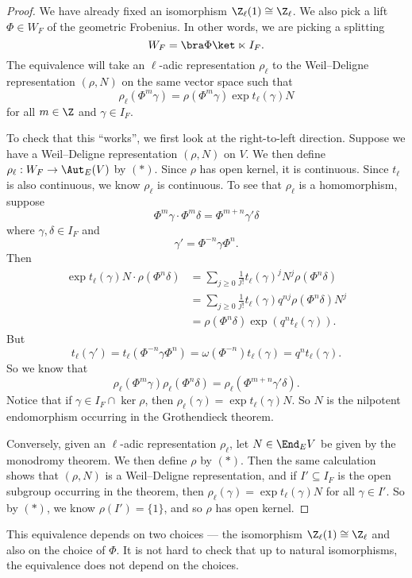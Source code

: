 \documentclass[a4paper]{article}
\begin{document}
\begin{proof}
  We have already fixed an isomorphism $\Z_\ell(1) \cong \Z_\ell$. We also pick a lift $\Phi \in W_F$ of the geometric Frobenius. In other words, we are picking a splitting
  \[
    W_F = \bra \Phi\ket \ltimes I_F.
  \]
  The equivalence will take an $\ell$-adic representation $\rho_\ell$ to the Weil--Deligne representation $(\rho, N)$ on the same vector space such that
  \[
    \rho_\ell(\Phi^m \gamma) = \rho (\Phi^m \gamma) \exp t_\ell(\gamma) N\tag{$*$}
  \]
  for all $m \in \Z$ and $\gamma \in I_F$.

  To check that this ``works'', we first look at the right-to-left direction. Suppose we have a Weil--Deligne representation $(\rho, N)$ on $V$. We then define $\rho_\ell: W_F \to \Aut_E(V)$ by $(*)$. Since $\rho$ has open kernel, it is continuous. Since $t_\ell$ is also continuous, we know $\rho_\ell$ is continuous. To see that $\rho_\ell$ is a homomorphism, suppose
  \[
    \Phi^m \gamma \cdot \Phi^m \delta = \Phi^{m + n} \gamma' \delta
  \]
  where $\gamma, \delta \in I_F$ and
  \[
    \gamma' = \Phi^{-n} \gamma \Phi^n.
  \]
  Then
  \begin{align*}
    \exp t_\ell(\gamma) N \cdot \rho(\Phi^n \delta) &= \sum_{j \geq 0} \frac{1}{j!} t_\ell(\gamma)^j N^j \rho(\Phi^n \delta)\\
    &= \sum_{j \geq 0} \frac{1}{j!} t_\ell(\gamma) q^{nj} \rho(\Phi^n \delta) N^j\\
    &= \rho (\Phi^n \delta) \exp (q^n t_\ell(\gamma)).
  \end{align*}
  But
  \[
    t_\ell(\gamma') = t_\ell(\Phi^{-n} \gamma \Phi^n) = \omega(\Phi^{-n}) t_\ell(\gamma) = q^n t_\ell(\gamma).
  \]
  So we know that
  \[
    \rho_\ell(\Phi^m \gamma) \rho_\ell(\Phi^n \delta) = \rho_\ell(\Phi^{m + n} \gamma' \delta).
  \]
  Notice that if $\gamma \in I_F \cap \ker \rho$, then $\rho_\ell(\gamma) = \exp t_\ell(\gamma) N$. So $N$ is the nilpotent endomorphism occurring in the Grothendieck theorem. %

  Conversely, given an $\ell$-adic representation $\rho_\ell$, let $N \in \End_EV$ be given by the monodromy theorem. We then define $\rho$ by $(*)$. Then the same calculation shows that $(\rho, N)$ is a Weil--Deligne representation, and if $I' \subseteq I_F$ is the open subgroup occurring in the theorem, then $\rho_\ell(\gamma) = \exp t_\ell(\gamma) N$ for all $\gamma \in I'$. So by $(*)$, we know $\rho(I') = \{1\}$, and so $\rho$ has open kernel.
\end{proof}
This equivalence depends on two choices --- the isomorphism $\Z_\ell(1) \cong \Z_\ell$ and also on the choice of $\Phi$. It is not hard to check that up to natural isomorphisms, the equivalence does not depend on the choices.
\end{document}
